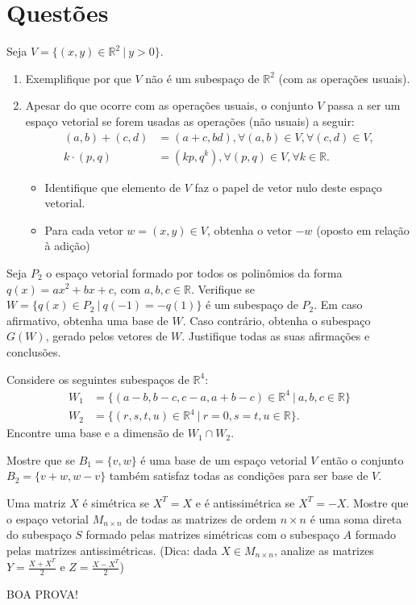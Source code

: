 \documentclass[12pt,a4paper]{article}
\newcommand{\fixme}{{\color{red}(...)}}
\newcommand*\R{\mathbb{R}}
\begin{document}
\section*{Questões}
\begin{ExerciseList}
\Exercise[title={2,5}] Seja $V = \{ (x,y) \in \R^2 \ |\ y > 0 \}$.
\begin{enumerate}
\item Exemplifique por que $V$ não é um subespaço de $\R^2$ (com as operações usuais).
\item Apesar do que ocorre com as operações usuais, o conjunto $V$ passa a ser um espaço vetorial se forem usadas as operações (não usuais) a seguir:
\begin{align*}
(a,b) + (c,d)  & = (a+c, bd), \forall (a, b) \in V, \forall (c, d) \in V, \\
k \cdot (p, q) & = (kp, q^k), \forall (p, q) \in V, \forall k \in \R.
\end{align*}
\begin{itemize}
\item Identifique que elemento de $V$ faz o papel de vetor nulo deste espaço vetorial.
\item Para cada vetor $w = (x,y) \in V$, obtenha o vetor $-w$ (oposto em relação à adição)
\end{itemize}
\end{enumerate}
\Answer \fixme

\Exercise[title={2,5}] Seja $P_2$ o espaço vetorial formado por todos os polinômios da forma $q(x) = ax^2 + bx + c$, com $a,b,c \in \R$.
Verifique se $W = \{ q(x) \in P_2\ |\ q(-1) = -q(1) \}$ é um subespaço de $P_2$. Em caso afirmativo, obtenha uma base de $W$. Caso contrário, obtenha o subespaço $G(W)$, gerado pelos vetores de $W$. Justifique todas as suas afirmações e conclusões.
\Answer \fixme

\Exercise[title={2,5}] Considere os seguintes subespaços de $\R^4$:
\begin{align*}
W_1 & = \{ (a-b,b-c,c-a,a+b-c) \in \R^4\ |\ a, b, c \in \R \} \\
W_2 & = \{ (r,s,t,u) \in \R^4\ |\ r = 0, s = t, u \in \R \}.
\end{align*}
Encontre uma base e a dimensão de $W_1 \cap W_2$.
\Answer \fixme

\Exercise[title={2,5}] Mostre que se $B_1 = \{ v, w \}$ é uma base de um espaço vetorial $V$ então o conjunto $B_2 = \{v + w, w - v \}$ também satisfaz todas as condições para ser base de $V$.
\Answer \fixme


\Exercise[title={2,5}] Uma matriz $X$ é simétrica se $X^T = X$ e é antissimétrica se $X^T = -X$. Mostre que o espaço vetorial $M_{n\times n}$ de todas as matrizes de ordem $n\times n$ é uma soma direta do subespaço $S$ formado pelas matrizes simétricas com o subespaço $A$ formado pelas matrizes antissimétricas. (Dica: dada $X \in M_{n \times n}$, analize as matrizes $Y = \frac{X + X^T}{2}$ e $Z = \frac{X - X^T}{2}$)
\Answer \fixme
\end{ExerciseList}

\begin{center}
BOA PROVA!
\end{center}

\end{document}
